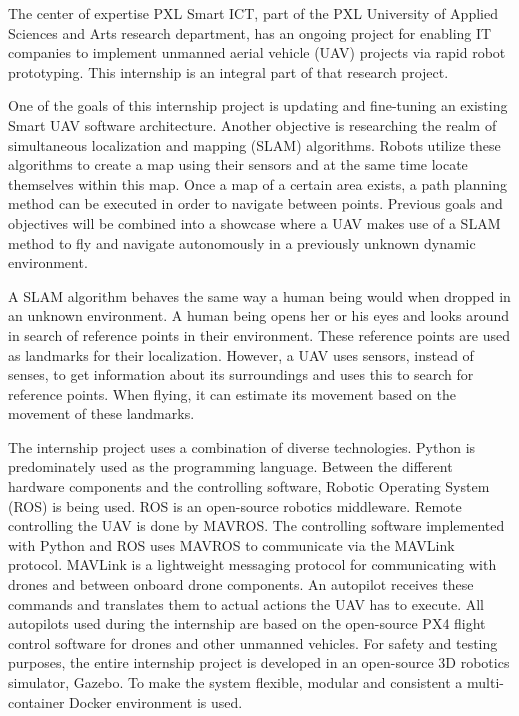 The center of expertise PXL Smart ICT, part of the PXL University of Applied Sciences and Arts research department, has an ongoing project for enabling IT companies to implement unmanned aerial vehicle (UAV) projects via rapid robot prototyping. This internship is an integral part of that research project.

One of the goals of this internship project is updating and fine-tuning an existing Smart UAV software architecture. Another objective is researching the realm of simultaneous localization and mapping (SLAM) algorithms. Robots utilize these algorithms to create a map using their sensors and at the same time locate themselves within this map. Once a map of a certain area exists, a path planning method can be executed in order to navigate between points. Previous goals and objectives will be combined into a showcase where a UAV makes use of a SLAM method to fly and navigate autonomously in a previously unknown dynamic environment.

A SLAM algorithm behaves the same way a human being would when dropped in an unknown environment. A human being opens her or his eyes and looks around in search of reference points in their environment. These reference points are used as landmarks for their localization. However, a UAV uses sensors, instead of senses, to get information about its surroundings and uses this to search for reference points. When flying, it can estimate its movement based on the movement of these landmarks.

The internship project uses a combination of diverse technologies. Python is predominately used as the programming language. Between the different hardware components and the controlling software, Robotic Operating System (ROS) is being used. ROS is an open-source robotics middleware. Remote controlling the UAV is done by MAVROS. The controlling software implemented with Python and ROS uses MAVROS to communicate via the MAVLink protocol. MAVLink is a lightweight messaging protocol for communicating with drones and between onboard drone components. An autopilot receives these commands and translates them to actual actions the UAV has to execute. All autopilots used during the internship are based on the open-source PX4 flight control software for drones and other unmanned vehicles. For safety and testing purposes, the entire internship project is developed in an open-source 3D robotics simulator, Gazebo. To make the system flexible, modular and consistent a multi-container Docker environment is used.

